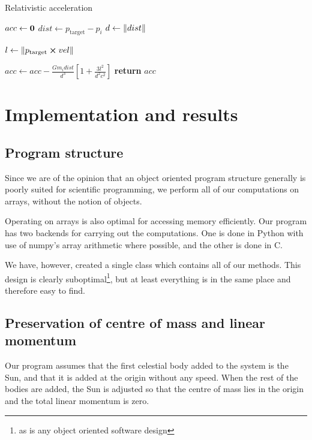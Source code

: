 \documentclass[a4paper]{article}
\begin{document}
\begin{algorithm}
\caption{Relativistic acceleration} \label{alg:acceleration_relativistic}
\begin{algorithmic}[1]
    \Statex {}
    \State $acc \gets \bf{0}$ 
            \State $dist \gets p_{\mathrm{target}} - p_{i}$
            \State $d \gets \norm{dist}$ 

            \State $l \gets \norm{p_{\mathrm{target}} \cross vel}$


            \State $acc \gets acc - \frac{G m_{i} dist}{d^3} \left[1 + \frac{3l^2}{d^2c^2}\right]$
        \EndIf
    \EndFor
    \State \textbf{return} $acc$
  \EndFunction
\end{algorithmic}
\end{algorithm}


\section{Implementation and results}\label{sec:implementation_and_results}
\subsection{Program structure}
Since we are of the opinion that an object oriented program structure generally is poorly suited for scientific programming, we perform all of our computations on arrays, without the notion of objects.

Operating on arrays is also optimal for accessing memory efficiently. Our program has two backends for carrying out the computations. One is done in Python with use of numpy's array arithmetic where possible, and the other is done in C.

We have, however, created a single class which contains all of our methods. This design is clearly suboptimal\footnote{as is any object oriented software design}, but at least everything is in the same place and therefore easy to find.

\subsection{Preservation of centre of mass and linear momentum}
Our program assumes that the first celestial body added to the system is the Sun, and that it is added at the origin without any speed. When the rest of the bodies are added, the Sun is adjusted so that the centre of mass lies in the origin and the total linear momentum is zero.
\end{document}

